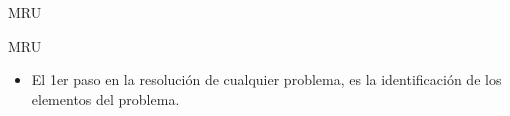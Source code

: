 \documentclass{beamer}
\begin{document}
\begin{frame}{MRU}
\begin{centering}
\end{centering}
                                                              
                                                               
                                                               
                                                               
                                                               
\end{frame}



\begin{frame}{MRU}
% 
 


 
\begin{itemize}                                                              

\item El 1er paso en la resoluci\'on de cualquier problema, es la
identificaci\'on de los elementos del problema.            
              
\end{itemize}

\end{frame}
\end{document}
